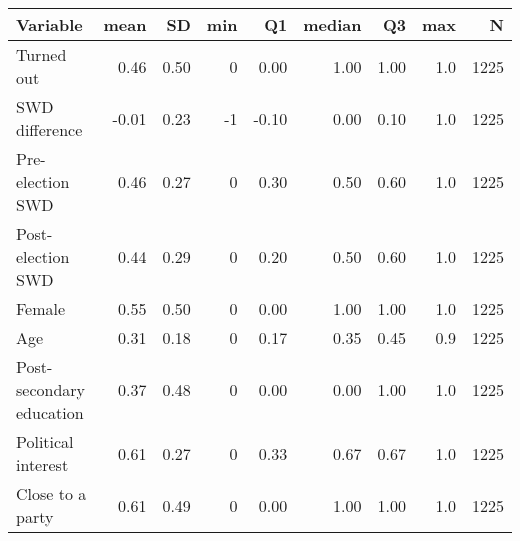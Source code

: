 
\begin{tabular}{l|r|r|r|r|r|r|r|r}
\hline
Variable & mean & SD & min & Q1 & median & Q3 & max & N\\
\hline
Turned out & 0.46 & 0.50 & 0 & 0.00 & 1.00 & 1.00 & 1.0 & 1225\\
\hline
SWD difference & -0.01 & 0.23 & -1 & -0.10 & 0.00 & 0.10 & 1.0 & 1225\\
\hline
Pre-election SWD & 0.46 & 0.27 & 0 & 0.30 & 0.50 & 0.60 & 1.0 & 1225\\
\hline
Post-election SWD & 0.44 & 0.29 & 0 & 0.20 & 0.50 & 0.60 & 1.0 & 1225\\
\hline
Female & 0.55 & 0.50 & 0 & 0.00 & 1.00 & 1.00 & 1.0 & 1225\\
\hline
Age & 0.31 & 0.18 & 0 & 0.17 & 0.35 & 0.45 & 0.9 & 1225\\
\hline
Post-secondary education & 0.37 & 0.48 & 0 & 0.00 & 0.00 & 1.00 & 1.0 & 1225\\
\hline
Political interest & 0.61 & 0.27 & 0 & 0.33 & 0.67 & 0.67 & 1.0 & 1225\\
\hline
Close to a party & 0.61 & 0.49 & 0 & 0.00 & 1.00 & 1.00 & 1.0 & 1225\\
\hline
\end{tabular}
